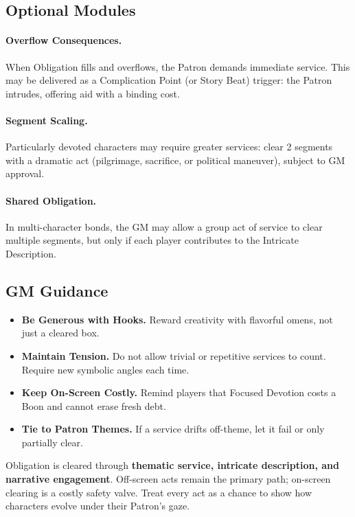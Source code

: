 \subsection{Optional Modules}\label{subsec:obligation-modules}
\paragraph{Overflow Consequences.} When Obligation fills and overflows, the Patron demands immediate service. This may be delivered as a Complication Point (or Story Beat) trigger: the Patron intrudes, offering aid with a binding cost.
\paragraph{Segment Scaling.} Particularly devoted characters may require greater services: clear 2 segments with a dramatic act (pilgrimage, sacrifice, or political maneuver), subject to GM approval.
\paragraph{Shared Obligation.} In multi-character bonds, the GM may allow a group act of service to clear multiple segments, but only if each player contributes to the Intricate Description.

\subsection{GM Guidance}\label{subsec:obligation-gm}
\begin{itemize}
\item \textbf{Be Generous with Hooks.} Reward creativity with flavorful omens, not just a cleared box.
\item \textbf{Maintain Tension.} Do not allow trivial or repetitive services to count. Require new symbolic angles each time.
\item \textbf{Keep On-Screen Costly.} Remind players that Focused Devotion costs a Boon and cannot erase fresh debt.
\item \textbf{Tie to Patron Themes.} If a service drifts off-theme, let it fail or only partially clear.
\end{itemize}

\begin{tcolorbox}[title={Summary},colback=gray!5,colframe=black]
Obligation is cleared through \textbf{thematic service, intricate description, and narrative engagement}. Off-screen acts remain the primary path; on-screen clearing is a costly safety valve. Treat every act as a chance to show how characters evolve under their Patron’s gaze.\end{tcolorbox}

